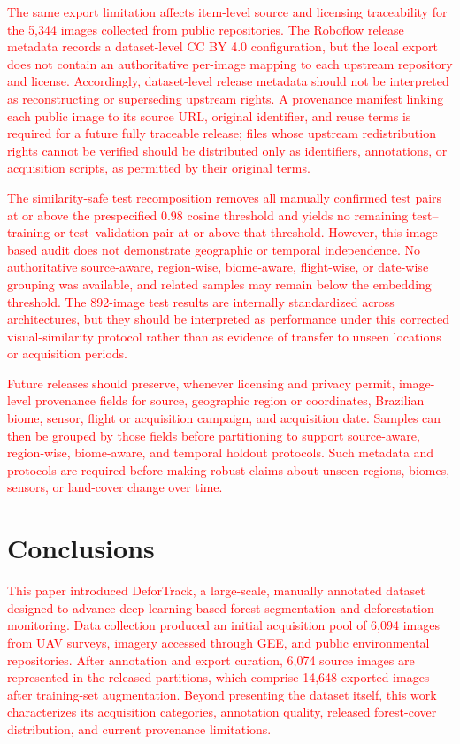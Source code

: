 \documentclass[journal,article,submit,pdftex,moreauthors]{Definitions/mdpi}
\begin{document}
\textcolor{red}{The same export limitation affects item-level source and licensing traceability for the 5,344 images collected from public repositories. The Roboflow release metadata records a dataset-level CC BY 4.0 configuration, but the local export does not contain an authoritative per-image mapping to each upstream repository and license. Accordingly, dataset-level release metadata should not be interpreted as reconstructing or superseding upstream rights. A provenance manifest linking each public image to its source URL, original identifier, and reuse terms is required for a future fully traceable release; files whose upstream redistribution rights cannot be verified should be distributed only as identifiers, annotations, or acquisition scripts, as permitted by their original terms.}

\textcolor{red}{The similarity-safe test recomposition removes all manually confirmed test pairs at or above the prespecified 0.98 cosine threshold and yields no remaining test--training or test--validation pair at or above that threshold. However, this image-based audit does not demonstrate geographic or temporal independence. No authoritative source-aware, region-wise, biome-aware, flight-wise, or date-wise grouping was available, and related samples may remain below the embedding threshold. The 892-image test results are internally standardized across architectures, but they should be interpreted as performance under this corrected visual-similarity protocol rather than as evidence of transfer to unseen locations or acquisition periods.}

\textcolor{red}{Future releases should preserve, whenever licensing and privacy permit, image-level provenance fields for source, geographic region or coordinates, Brazilian biome, sensor, flight or acquisition campaign, and acquisition date. Samples can then be grouped by those fields before partitioning to support source-aware, region-wise, biome-aware, and temporal holdout protocols. Such metadata and protocols are required before making robust claims about unseen regions, biomes, sensors, or land-cover change over time.}


\section{Conclusions}\label{sec:conclusions}

\textcolor{red}{This paper introduced DeforTrack, a large-scale, manually annotated dataset designed to advance deep learning-based forest segmentation and deforestation monitoring. Data collection produced an initial acquisition pool of 6,094 images from UAV surveys, imagery accessed through GEE, and public environmental repositories. After annotation and export curation, 6,074 source images are represented in the released partitions, which comprise 14,648 exported images after training-set augmentation. Beyond presenting the dataset itself, this work characterizes its acquisition categories, annotation quality, released forest-cover distribution, and current provenance limitations.}
\end{document}
